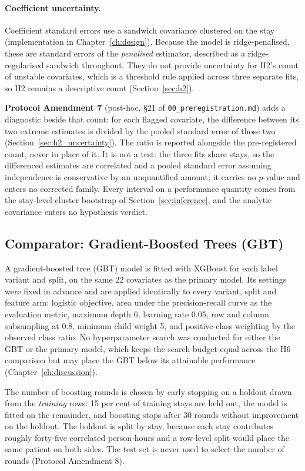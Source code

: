 \paragraph{Coefficient uncertainty.}
Coefficient standard errors use a sandwich covariance clustered on the stay
(implementation in Chapter~\ref{ch:design}). Because the model is
ridge-penalised, these are standard errors of the \emph{penalised} estimator,
described as a ridge-regularised sandwich throughout. They do not provide
uncertainty for H2's count of unstable covariates, which is a threshold rule
applied across three separate fits, so H2 remains a descriptive count
(Section~\ref{sec:h2}).

\textbf{Protocol Amendment 7} (post-hoc, \S21 of
\texttt{00\_preregistration.md}) adds a diagnostic beside that count: for each
flagged covariate, the difference between its two extreme estimates is
divided by the pooled standard error of those two
(Section~\ref{sec:h2_uncertainty}). The ratio is reported alongside the
pre-registered count, never in place of it. It is not a test: the three fits
share stays, so the differenced estimates are correlated and a pooled standard
error assuming independence is conservative by an unquantified amount; it
carries no $p$-value and enters no corrected family. Every interval on a
performance quantity comes from the stay-level cluster bootstrap of
Section~\ref{sec:inference}, and the analytic covariance enters no hypothesis
verdict.

\subsection{Comparator: Gradient-Boosted Trees (GBT)}
\label{sec:gbt_spec}

A gradient-boosted tree (GBT) model is fitted with XGBoost for each label
variant and split, on the same 22 covariates as the primary model. Its
settings were fixed in advance and are applied identically to every variant,
split and feature arm: logistic objective, area under the precision-recall
curve as the evaluation metric, maximum depth 6, learning rate 0.05, row and
column subsampling at 0.8, minimum child weight 5, and positive-class
weighting by the observed class ratio. No hyperparameter search was conducted
for either the GBT or the primary model, which keeps the search budget equal
across the H6 comparison but may place the GBT below its attainable
performance (Chapter~\ref{ch:discussion}).

The number of boosting rounds is chosen by early stopping on a holdout drawn
from the \emph{training} rows: 15 per cent of training stays are held out, the
model is fitted on the remainder, and boosting stops after 30 rounds without
improvement on the holdout. The holdout is split by stay, because each stay
contributes roughly forty-five correlated person-hours and a row-level split
would place the same patient on both sides. The test set is never used to
select the number of rounds (Protocol Amendment 8).

